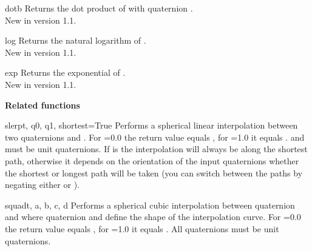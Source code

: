\begin{methoddesc}{dot}{b}
Returns the dot product of  with quaternion .\\
New in version 1.1.
\end{methoddesc}

\begin{methoddesc}{log}{}
Returns the natural logarithm of .\\
New in version 1.1.
\end{methoddesc}

\begin{methoddesc}{exp}{}
Returns the exponential of . \\
New in version 1.1.
\end{methoddesc}

{\bf Related functions}

\begin{funcdesc}{slerp}{t, q0, q1, shortest=True}
Performs a spherical linear interpolation between two quaternions 
and . For =0.0 the return value equals , for 
=1.0 it equals .  and  must be unit 
quaternions. If  is  the interpolation will always
be along the shortest path, otherwise it depends on the orientation of
the input quaternions whether the shortest or longest path will be taken
(you can switch between the paths by negating either  or ).
\end{funcdesc}

\begin{funcdesc}{squad}{t, a, b, c, d}
Performs a spherical cubic interpolation between quaternion  and 
where quaternion  and  define the shape of the interpolation
curve. For =0.0 the return value equals , for =1.0 it 
equals . All quaternions must be unit quaternions.
\end{funcdesc}





